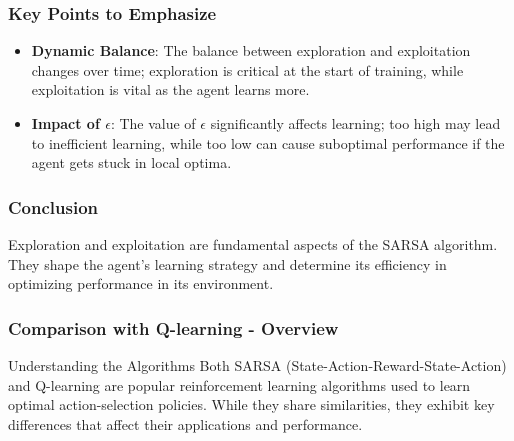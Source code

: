 \documentclass{beamer}
\begin{document}
\begin{frame}[fragile]
    \frametitle{Key Points to Emphasize}
    \begin{itemize}
        \item \textbf{Dynamic Balance}: The balance between exploration and exploitation changes over time; exploration is critical at the start of training, while exploitation is vital as the agent learns more.
        \item \textbf{Impact of $\epsilon$}: The value of $\epsilon$ significantly affects learning; too high may lead to inefficient learning, while too low can cause suboptimal performance if the agent gets stuck in local optima.
    \end{itemize}
\end{frame}

\begin{frame}[fragile]
    \frametitle{Conclusion}
    Exploration and exploitation are fundamental aspects of the SARSA algorithm. They shape the agent's learning strategy and determine its efficiency in optimizing performance in its environment.
\end{frame}

\begin{frame}[fragile]
    \frametitle{Comparison with Q-learning - Overview}
    \begin{block}{Understanding the Algorithms}
        Both SARSA (State-Action-Reward-State-Action) and Q-learning are popular reinforcement learning algorithms used to learn optimal action-selection policies.
        While they share similarities, they exhibit key differences that affect their applications and performance.
    \end{block}
\end{frame}
\end{document}
